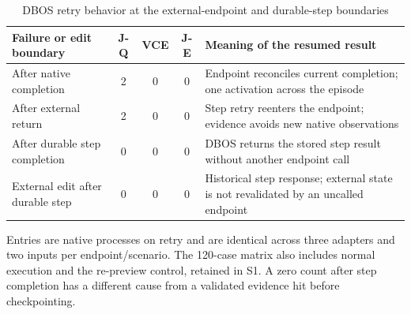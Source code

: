 \begin{table}[!t]\centering\small
\caption{DBOS retry behavior at the external-endpoint and durable-step boundaries}\label{tab:eval-dbos}
\begin{tabular}{@{}>{\raggedright\arraybackslash}p{4.25cm}ccc >{\raggedright\arraybackslash}p{7.3cm}@{}}\toprule
Failure or edit boundary & J-Q & VCE & J-E & Meaning of the resumed result \\\midrule
After native completion & 2 & 0 & 0 & Endpoint reconciles current completion; one activation across the episode \\
After external return & 2 & 0 & 0 & Step retry reenters the endpoint; evidence avoids new native observations \\
After durable step completion & 0 & 0 & 0 & DBOS returns the stored step result without another endpoint call \\
External edit after durable step & 0 & 0 & 0 & Historical step response; external state is not revalidated by an uncalled endpoint \\\bottomrule
\end{tabular}
\par\smallskip\raggedright\footnotesize Entries are native processes on retry and are identical across three adapters and two inputs per endpoint/scenario. The 120-case matrix also includes normal execution and the re-preview control, retained in S1. A zero count after step completion has a different cause from a validated evidence hit before checkpointing.
\end{table}
